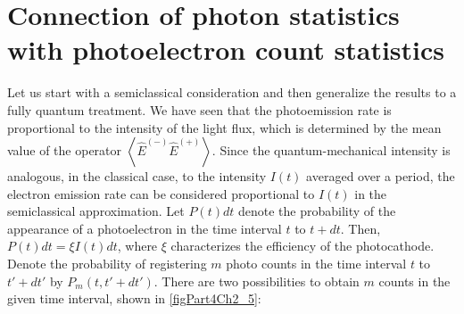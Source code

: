\section{Connection of photon statistics with photoelectron count statistics}
Let us start with a semiclassical consideration and then generalize the results to a fully quantum treatment. We have seen that the photoemission rate is proportional to the intensity of the light flux, which is determined by the mean value of the operator $\left<\hat{E}^{(-)}\hat{E}^{(+)}\right>$. Since the quantum-mechanical intensity is analogous, in the classical case, to the intensity $I\left(t\right)$ averaged over a period, the electron emission rate can be considered proportional to $I\left(t\right)$ in the semiclassical approximation. Let $P\left(t\right)dt$ denote the probability of the appearance of a photoelectron in the time interval $t$ to $t + dt$. Then, $P\left(t\right)dt = \xi I\left(t\right)dt$, where $\xi$ characterizes the efficiency of the photocathode. Denote the probability of registering $m$ photo counts in the time interval $t$ to $t' + dt'$ by $P_m\left(t, t' + dt'\right)$. There are two possibilities to obtain $m$ counts in the given time interval, shown in \autoref{figPart4Ch2_5}:



